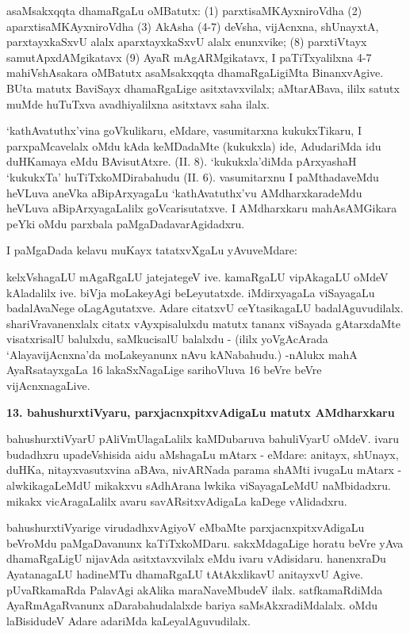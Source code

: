 asaMsakxqqta dhamaRgaLu oMBatutx: 
(1) parxtisaMKAyxniroVdha
(2) aparxtisaMKAyx\-niroVdha
(3) AkAsha
(4-7) deVsha, vijAcnxna, shUnayxtA, parxtayxkaSxvU alalx aparxtayxkaSxvU alalx enunxvike;
(8) parxtiVtayx samutApxdAMgikatavx
(9) AyaR mAgARMgikatavx, 
I paTiTxyalilxna 4-7 mahiVshAsakara oMBatutx asaMsakxqqta dhamaRgaLigiMta BinanxvAgive. BUta matutx BaviSayx dhamaRgaLige asitxtavxvilalx; aMtarABava, ililx satutx muMde huTuTxva avadhiyalilxna asitxtavx saha ilalx.

`kathAvatuthx'vina goVkulikaru, eMdare, vasumitarxna kukukxTikaru, I parxpaMcavelalx oMdu kAda keMDadaMte (kukukxla) ide, AdudariMda idu duHKamaya eMdu BAvisutAtxre. {\rm (II. 8)}. `kukukxla'diMda pArxyashaH `kukukxTa' huTiTxkoMDirabahudu {\rm (II. 6)}. vasumitarxnu I paMthadaveMdu heVLuva aneVka aBipArxyagaLu `kathAvatuthx'vu AMdharxkaradeMdu heVLuva aBipArxyagaLalilx goVcarisutatxve. I AMdharxkaru mahAsAMGikara peYki oMdu parxbala paMgaDadavarAgidadxru.

I paMgaDada kelavu muKayx tatatxvXgaLu yAvuveMdare:

kelxVshagaLU mAgaRgaLU jatejategeV ive. kamaRgaLU vipAkagaLU oMdeV kAladalilx ive. biVja moLakeyAgi beLeyutatxde. iMdirxyagaLa viSayagaLu badalAvaNege oLagAgutatxve. Adare citatxvU ceYtasikagaLU badalAguvudilalx. shariVravanenxlalx citatx vAyxpisalulxdu matutx tananx viSayada gAtarxdaMte visatxrisalU balulxdu, saMkucisalU balalxdu - (ililx yoVgAcArada `AlayavijAcnxna'da moLakeyanunx nAvu kANabahudu.) -nAlukx mahA AyaRsatayxgaLa 16 lakaSxNagaLige sarihoVluva 16 beVre beVre vijAcnxnagaLive. 

\begin{center}
{\textbf{\Large 13. bahushurxtiVyaru, parxjacnxpitxvAdigaLu matutx AMdharxkaru}}
\end{center}

bahushurxtiVyarU pAliVmUlagaLalilx kaMDubaruva bahuliVyarU oMdeV. ivaru budadhxru upadeVshisida aidu aMshagaLu mAtarx - eMdare: anitayx, shUnayx, duHKa, nitayxvasutxvina aBAva, nivARNada parama shAMti ivugaLu mAtarx - alwkikagaLeMdU mikakxvu sAdhArana lwkika viSayagaLeMdU naMbidadxru. mikakx vicAragaLalilx avaru savARsitxvAdigaLa kaDege vAlidadxru.

bahushurxtiVyarige virudadhxvAgiyoV eMbaMte parxjacnxpitxvAdigaLu beVroMdu paMgaDavanunx kaTiTxkoMDaru. sakxMdagaLige horatu beVre yAva dhamaRgaLigU nijavAda asitxtavxvilalx eMdu ivaru vAdisidaru. hanenxraDu AyatanagaLU hadineMTu dhamaRgaLU tAtAkxlikavU anitayxvU Agive. pUvaRkamaRda PalavAgi akAlika maraNaveMbudeV ilalx. satfkamaRdiMda AyaRmAgaRvanunx aDarabahudalalxde bariya saMsAkxradiMdalalx. oMdu laBisidudeV Adare adariMda kaLeyalAguvudilalx.

